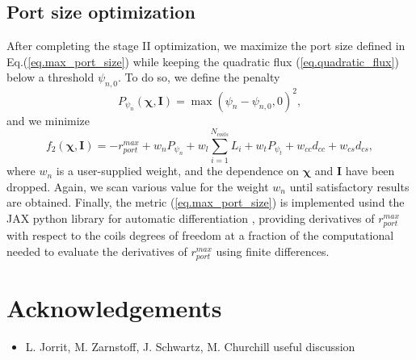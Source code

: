 \documentclass[12pt]{article}
\begin{document}
\subsection{Port size optimization}
After completing the stage II optimization, we maximize the port size defined in Eq.(\ref{eq.max_port_size}) while keeping the quadratic flux (\ref{eq.quadratic_flux}) below a threshold $\psi_{n,0}$. To do so, we define the penalty
\begin{equation}
    P_{\psi_n}(\boldsymbol\chi, \mathbf{I}) = \max(\psi_n-\psi_{n,0}, 0 )^2,
\end{equation}
and we minimize
\begin{equation}
    f_2(\boldsymbol\chi, \mathbf{I}) = -r^{max}_{port} + w_nP_{\psi_n} + w_l\sum_{i=1}^{N_{coils}}L_i + w_tP_{\psi_t} + w_{cc}d_{cc} + w_{cs}d_{cs},
\end{equation}
where $w_n$ is a user-supplied weight, and the dependence on $\boldsymbol{\chi}$ and $\mathbf{I}$ have been dropped. Again, we scan various value for the weight $w_n$ until satisfactory results are obtained. Finally, the metric (\ref{eq.max_port_size}) is implemented usind the JAX python library for automatic differentiation \cite{jax2018github}, providing derivatives of $r^{max}_{port}$ with respect to the coils degrees of freedom at a fraction of the computational needed to evaluate the derivatives of $r^{max}_{port}$ using finite differences. 







\newpage
\section*{Acknowledgements}
\begin{itemize}
\item L. Jorrit, M. Zarnstoff, J. Schwartz, M. Churchill useful discussion
\end{itemize}







\printbibliography
\end{document}
